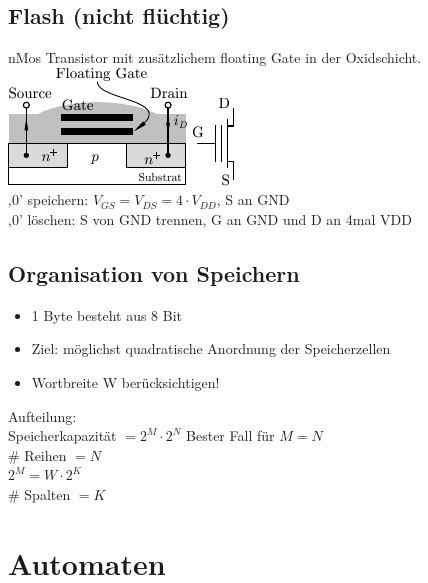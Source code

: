 \documentclass[6pt,a4paper]{scrartcl}
\begin{document}
\begin{multicols}{3}
	\subsection{Flash (nicht flüchtig)}
	nMos Transistor mit zusätzlichem floating Gate in der Oxidschicht.\\
	\includegraphics{img/ds/flash.pdf} \qquad \includegraphics{img/ds/flashsymbol.pdf}\\
	‚0’ speichern: $V_{GS} = V_{DS} = 4 \cdot V_{DD}$, S an GND\\
	‚0’ löschen: S von GND trennen, G an GND und D an 4mal VDD\\
 

\subsection{Organisation von Speichern} 

\begin{itemize} \itemsep0pt
	\item 1 Byte besteht aus 8 Bit
	\item Ziel: möglichst quadratische Anordnung der Speicherzellen
	\item Wortbreite W berücksichtigen!	
\end{itemize}
Aufteilung:\\
Speicherkapazität $= 2^M \cdot 2^N$ Bester Fall für $M=N$\\ 
\# Reihen $= N$\\
$2^M = W \cdot 2^K$\\
\# Spalten $= K$\\









\section{Automaten} %


\end{multicols}
\end{document}
